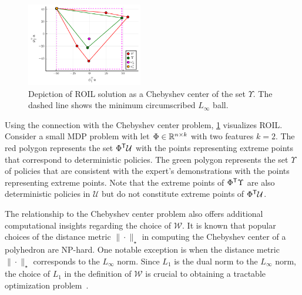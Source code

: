 \documentclass[10pt]{article}
\renewcommand{\cite}{\citep}
\theoremstyle{plain}
\theoremstyle{remark}
\newcommand{\gersi}[1]{\textcolor{red}{[#1]}}
\begin{document}
\begin{figure}
    \centering
    \includegraphics[width=0.45\textwidth]{../notebooks/plots/visual_solve_cheb.pdf}
    \caption{Depiction of ROIL solution as a Chebyshev center of the set $\Upsilon$. The dashed line shows the minimum circumscribed $L_{\infty}$ ball.}
    \label{fig:visual_representation_of_ROIL}
\end{figure}

Using the connection with the Chebyshev center problem, \cref{fig:visual_representation_of_ROIL} visualizes ROIL. Consider a small MDP problem with let $\Phi \in \mathbb{R}^{n \times k}$ with two features $k = 2$. The red polygon represents the set $\Phi^{\mathsf{T}} \mathcal{U}$ with the points representing extreme points that correspond to deterministic policies. The green polygon represents the set $\Upsilon$ of policies that are consistent with the expert's demonstrations with the points representing extreme points. Note that the extreme points of $\Phi^{\mathsf{T}} \Upsilon$ are also deterministic policies in $\mathcal{U}$ but do not constitute extreme points of $\Phi^{\mathsf{T}} \mathcal{U}$.

The relationship to the Chebyshev center problem also offers additional computational insights regarding the choice of $\mathcal{W}$. It is known that popular choices of the distance metric $\| \cdot  \|_{\star}$ in computing the Chebyshev center of a polyhedron are NP-hard. One notable exception is when the distance metric $\| \cdot \|_{\star}$ corresponds to the $L_{\infty}$ norm. Since $L_1$ is the dual norm to the $L_{\infty}$ norm, the choice of $L_1$ in the definition of $\mathcal{W}$ is crucial to obtaining a tractable optimization problem~\cite{Wu2013, Eldar2008}. 


\end{document}
